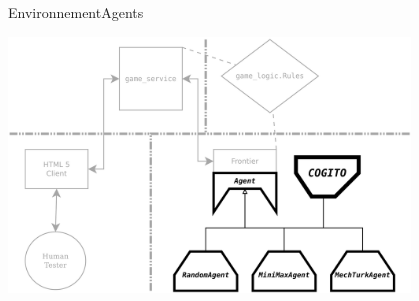 \begin{frame}{Environnement}{Agents}
\begin{center}
\includegraphics[width=0.8\textwidth]{img/william/archi_agents}\\
\end{center}
\end{frame}